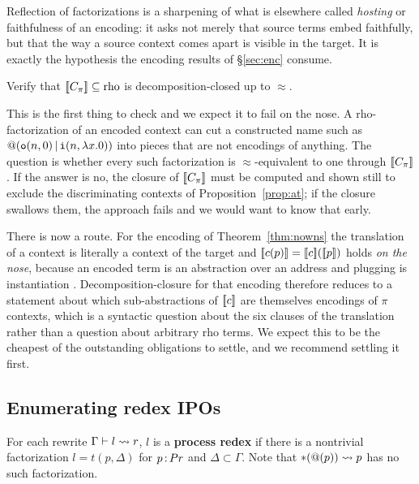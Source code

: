 \documentclass{article}
\begin{document}
Reflection of factorizations is a sharpening of what is elsewhere called \emph{hosting} or faithfulness of an encoding: it asks not merely that source terms embed faithfully, but that the way a source context comes apart is visible in the target. It is exactly the hypothesis the encoding results of \S\ref{sec:enc} consume.

\begin{obligation}
\label{ob:decomp}
    Verify that $[\![C_\pi]\!]\subseteq\mathrm{rho}$ is decomposition-closed up to $\approx$.
\end{obligation}

This is the first thing to check and we expect it to fail on the nose. A rho-factorization of an encoded context can cut a constructed name such as $@(\mathtt{o}(n,0)\,|\,\mathtt{i}(n,\lambda x.0))$ into pieces that are not encodings of anything. The question is whether every such factorization is $\approx$-equivalent to one through $[\![C_\pi]\!]$. If the answer is no, the closure of $[\![C_\pi]\!]$ must be computed and shown still to exclude the discriminating contexts of Proposition~\ref{prop:at}; if the closure swallows them, the approach fails and we would want to know that early.

    There is now a route. For the encoding of Theorem~\ref{thm:nowns} the translation of a context is literally a context of the target and $[\![c(p)]\!]=[\![c]\!]([\![p]\!])$ holds \emph{on the nose}, because an encoded term is an abstraction over an address and plugging is instantiation \citep{nowns}. Decomposition-closure for that encoding therefore reduces to a statement about which sub-abstractions of $[\![c]\!]$ are themselves encodings of $\pi$ contexts, which is a syntactic question about the six clauses of the translation rather than a question about arbitrary rho terms. We expect this to be the cheapest of the outstanding obligations to settle, and we recommend settling it first.

\subsection{Enumerating redex IPOs}

\begin{definition}
    For each rewrite $\Gamma\vdash l\rightsquigarrow r$, $l$ is a \textbf{process redex} if there is a nontrivial factorization $l = t(p,\Delta)$ for $p\,{:}\, Pr$ and $\Delta\subset \Gamma$. Note that $\ast(@(p))\rightsquigarrow p$ has no such factorization.
\end{definition}
\end{document}
